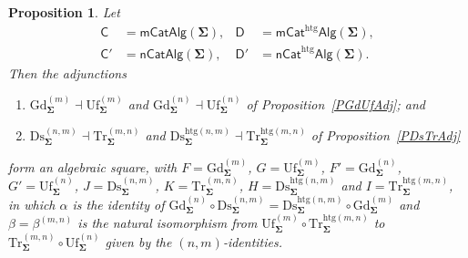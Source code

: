\documentclass[a4paper, reqno]{amsbook}
\newcommand{\sig}[1]{\mathbf{#1}}             %
\newcommand{\htg}{\mathrm{htg}}                %
\newcommand{\Gd}{\mathrm{Gd}}
\newcommand{\Uf}{\mathrm{Uf}}
\newcommand{\Ds}{\mathrm{Ds}}
\newcommand{\Tr}{\mathrm{Tr}}
\theoremstyle{plain}
\newtheorem{proposition}[theorem]{Proposition}
\theoremstyle{definition}
\begin{document}
\begin{proposition}\label{PAlgSquareFinite}
Let
$$
\begin{aligned}
\mathsf{C}&=\mathsf{mCatAlg}(\sig{\Sigma}), &
\mathsf{D}&=\mathsf{mCat}^{\htg}\mathsf{Alg}(\sig{\Sigma}),\\
\mathsf{C}'&=\mathsf{nCatAlg}(\sig{\Sigma}), &
\mathsf{D}'&=\mathsf{nCat}^{\htg}\mathsf{Alg}(\sig{\Sigma}).
\end{aligned}
$$
Then the adjunctions
\begin{enumerate}
\item $\Gd^{(m)}_{\sig{\Sigma}}\dashv\Uf^{(m)}_{\sig{\Sigma}}$ and $\Gd^{(n)}_{\sig{\Sigma}}\dashv\Uf^{(n)}_{\sig{\Sigma}}$ of Proposition~\ref{PGdUfAdj}; and
\item $\Ds^{(n,m)}_{\sig{\Sigma}}\dashv \Tr^{(m,n)}_{\sig{\Sigma}}$ and $\Ds^{\htg(n,m)}_{\sig{\Sigma}}\dashv \Tr^{\htg(m,n)}_{\sig{\Sigma}}$ of Proposition~\ref{PDsTrAdj}
\end{enumerate}
form an algebraic square, with $F=\Gd^{(m)}_{\sig{\Sigma}}$, $G=\Uf^{(m)}_{\sig{\Sigma}}$, $F'=\Gd^{(n)}_{\sig{\Sigma}}$, $G'=\Uf^{(n)}_{\sig{\Sigma}}$, $J=\Ds^{(n,m)}_{\sig{\Sigma}}$, $K=\Tr^{(m,n)}_{\sig{\Sigma}}$, $H=\Ds^{\htg(n,m)}_{\sig{\Sigma}}$ and $I=\Tr^{\htg(m,n)}_{\sig{\Sigma}}$, in which $\alpha$ is the identity of $\Gd^{(n)}_{\sig{\Sigma}}\circ\Ds^{(n,m)}_{\sig{\Sigma}}=\Ds^{\htg(n,m)}_{\sig{\Sigma}}\circ\Gd^{(m)}_{\sig{\Sigma}}$ and $\beta=\beta^{(m,n)}$ is the natural isomorphism from $\Uf^{(m)}_{\sig{\Sigma}}\circ \Tr^{\htg(m,n)}_{\sig{\Sigma}}$ to $\Tr^{(m,n)}_{\sig{\Sigma}}\circ\Uf^{(n)}_{\sig{\Sigma}}$ given by the $(n,m)$-identities.


\end{proposition}
\end{document}
